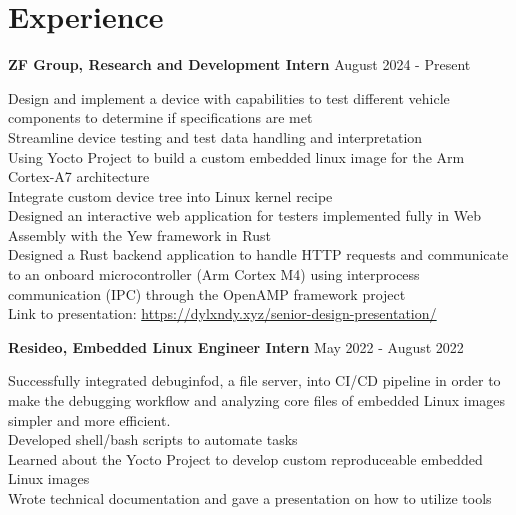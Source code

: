 \documentclass[letter,12pt]{article}
\begin{document}
\vspace{-1.0cm}
\section*{Experience} 
\begin{tcolorbox}
[colback=gray!25,
  leftrule=0pt,
  rightrule=0pt,
  sharp corners]
\textbf{ZF Group, Research and Development Intern} \hfill August 2024 - Present 
\end{tcolorbox}
\noindent\textbullet \- Design and implement a device with capabilities to test different vehicle components to determine if specifications are met\\
\textbullet \- Streamline device testing and test data handling and interpretation\\
\textbullet \- Using Yocto Project to build a custom embedded linux image for the Arm Cortex-A7 architecture \\
\textbullet \- Integrate custom device tree into Linux kernel recipe \\
\textbullet \- Designed an interactive web application for testers implemented fully in Web Assembly with the Yew framework in Rust \\
\textbullet \- Designed a Rust backend application to handle HTTP requests and communicate to an onboard microcontroller (Arm Cortex M4)
using interprocess communication (IPC) through the OpenAMP framework project\\
\textbullet \- Link to presentation: \textcolor{cyan}{\underline{\url{https://dylxndy.xyz/senior-design-presentation/}}}\\
\vspace{-.5cm}
\begin{tcolorbox}
[colback=gray!25,
  leftrule=0pt,
  rightrule=0pt,
  sharp corners]
\noindent\textbf{Resideo, Embedded Linux
Engineer Intern} \hfill May 2022 - August 2022 
\end{tcolorbox}
\noindent\textbullet \- Successfully integrated
debuginfod, a file server, into CI/CD pipeline in order to make the debugging
workflow and analyzing core files of embedded Linux images simpler and more
efficient.\\
\textbullet \- Developed shell/bash scripts to automate tasks\\
\textbullet \- Learned about the Yocto Project to develop custom reproduceable 
embedded Linux images\\
\textbullet \- Wrote technical documentation and gave a presentation on 
how to utilize tools\\
\end{document}
